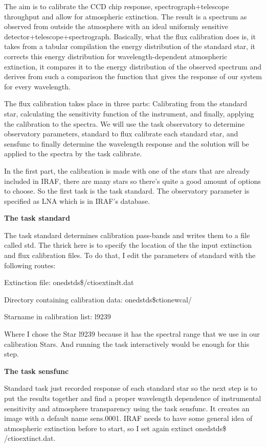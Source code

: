 The aim is to calibrate the CCD chip response, spectrograph+telescope throughput and allow for atmospheric extinction. The result is a spectrum as observed from outside the atmosphere with an ideal uniformly sensitive detector+telescope+spectrograph. Basically, what the flux calibration does is, it takes from a tabular compilation the energy distribution of the standard star, it corrects this energy distribution for wavelength-dependent atmospheric extinction, it compares it to the energy distribution of the observed spectrum and derives from such a comparison the function that gives the response of our system for every wavelength.

The flux calibration takes place in three parts: Calibrating from the standard star, calculating the sensitivity function of the instrument, and finally, applying the calibration to the spectra. We will use the task observatory to determine observatory parameters, standard to flux calibrate each standard star, and sensfunc to finally determine the wavelength response and the solution will be applied to the spectra by the task calibrate.

In the first part, the calibration is made with one of the stars that are already included in IRAF, there are many stars so there's quite a good amount of options to choose. So the first task is the task standard. The observatory parameter is specified as LNA which is in IRAF's database. 

\textbf{The task standard}

The task standard determines calibration pass-bands and writes them to a file called std. The thrick here is to specify the location of the the input extinction and flux calibration files. To do that, I edit the parameters of standard with the following routes:

Extinction file:                              onedstds\$/ctioextindt.dat

Directory containing calibration data:   onedstds\$ctionewcal/

Starname in calibration list:                l9239

Where I chose the Star l9239 because it has the spectral range that we use in our calibration Stars. And running the task interactively would be enough for this step.

\textbf{The task sensfunc}

Standard task just recorded response of each standard star so the next step is to put the results together and find a proper wavelength dependence of instrumental sensitivity and atmosphere transparency using the task sensfunc. It creates an image with a default name sens.0001. IRAF needs to have some general idea of atmospheric extinction before to start, so I set again extinct onedstds\$ /ctioextinct.dat.

